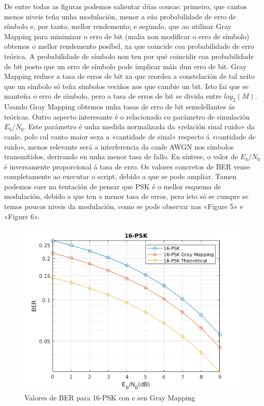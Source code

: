 \documentclass[
	10pt, %
	spanish, %
]{fphw}
\begin{document}
De entre todas as figuras podemos salientar dúas cousas: primeiro, que cantos menos niveis teña unha modulación, menor a súa probabilidade de erro de símbolo e, por tanto, mellor rendemento; e segundo, que ao utilizar Gray Mapping para minimizar o erro de bit (malia non modificar o erro de símbolo) obtemos o mellor rendemento posíbel, xa que coincide coa probabilidade de erro teórica. A probabilidade de símbolo non ten por qué coincidir coa probabilidade de bit posto que un erro de símbolo pode implicar máis dun erro de bit. Gray Mapping reduce a tasa de erros de bit xa que reordea a constelación de tal xeito que un símbolo só teña símbolos veciños nos que cambie un bit. Isto fai que se manteña o erro de símbolo, pero a tasa de erros de bit se divida entre $log_2(M)$. Usando Gray Mapping obtemos unha tasas de erro de bit semelellantes ás teóricas. Outro aspecto interesante é o relacionado co parámetro de simulación $E_b/N_0$. Este parámetro é unha medida normalizada da «relación sinal ruido» da canle, polo cal canto maior sexa a «cantidade de sinal» respecto á «cantidade de ruido», menos relevante será a interferencia da canle AWGN nos símbolos transmitidos, derivando en unha menor tasa de fallo. En síntese, o valor de $E_b/N_0$ é inversamente proporcional á tasa de erro.
Os valores concretos de BER vense completamente ao executar o script, debido a que se pode ampliar.
Tamen podemos caer na tentación de pensar que PSK é o mellor esquema de modulación, debido a que ten a menor tasa de erros, pero isto só se cumpre se temos poucos niveis da modulación, como se pode observar nas «Figure 5» e «Figure 6».
\begin{figure}[htb]
\centering
\includegraphics{16_psk.png}
\caption{Valores de BER para 16-PSK con e sen Gray Mapping}
\end{figure}
\end{document}
